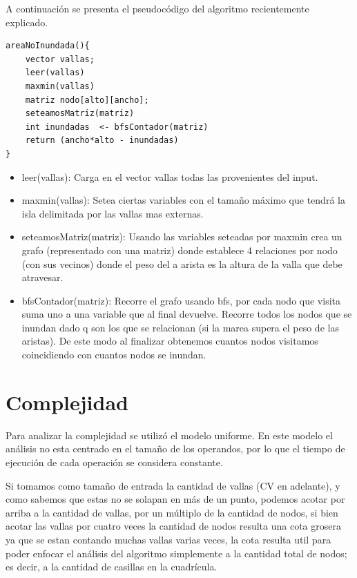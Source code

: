 \documentclass[a4paper, 12pt]{article}
\begin{document}
A continuaci\'on se presenta el pseudoc\'odigo del algoritmo recientemente explicado.

\begin{verbatim}
areaNoInundada(){
	vector vallas;
	leer(vallas)
	maxmin(vallas)
	matriz nodo[alto][ancho];
	seteamosMatriz(matriz)
	int inundadas  <- bfsContador(matriz)
	return (ancho*alto - inundadas)
}
\end{verbatim}
\begin{itemize}
\item leer(vallas): Carga en el vector vallas todas las provenientes del input.

\item maxmin(vallas): Setea ciertas variables con el tama\~no m\'aximo que tendrá la isla delimitada por las vallas mas externas.

\item seteamosMatriz(matriz): Usando las variables seteadas por maxmin crea un grafo (representado con una matriz) donde establece 4 relaciones por nodo (con sus vecinos) donde el peso del a arista es la altura de la valla que debe atravesar.

\item bfsContador(matriz): Recorre el grafo usando bfs, por cada nodo que visita suma uno a una variable que al final devuelve. Recorre todos los nodos que se inundan dado q son los que se relacionan (si la marea supera el peso de las aristas). De este modo al finalizar obtenemos cuantos nodos visitamos coincidiendo con cuantos nodos se inundan.
\end{itemize}


\section*{Complejidad}
Para analizar la complejidad se utiliz\'o el modelo uniforme. En este modelo el an\'alisis no esta centrado en el tama\~{n}o de los operandos, por lo que el tiempo de ejecuci\'on de cada operaci\'on se considera constante.

Si tomamos como tama\~no de entrada la cantidad de vallas (CV en adelante), y como sabemos que estas no se solapan en m\'as de un punto, podemos acotar por arriba a la cantidad de vallas, por un m\'ultiplo de la cantidad de nodos, si bien acotar las vallas por cuatro veces la cantidad de nodos resulta una cota grosera ya que se estan contando muchas vallas varias veces, la cota resulta util para poder enfocar el an\'alisis del algoritmo simplemente a la cantidad total de nodos; es decir, a la cantidad de casillas en la cuadr\'icula.
\end{document}
